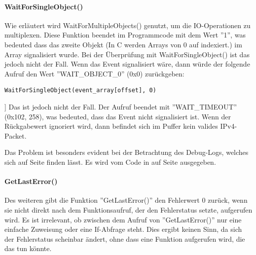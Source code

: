 \paragraph{WaitForSingleObject()}
Wie erläutert wird WaitForMultipleObjects() genutzt, um die IO-Operationen
zu multiplexen. Diese Funktion beendet im Programmcode mit dem Wert ''1'',
was bedeuted dass das zweite Objekt (In C werden Arrays von 0 auf indexiert.)
im Array signalisiert wurde. Bei der Überprüfung mit WaitForSingleObject() ist das jedoch nicht
der Fall. Wenn das Event signalisiert wäre, dann würde der folgende Aufruf
den Wert ''WAIT\_OBJECT\_0'' (0x0) zurückgeben:
\begin{lstlisting}
WaitForSingleObject(event_array[offset], 0)
\end{lstlisting}]
Das ist jedoch nicht der Fall. Der Aufruf beendet mit ''WAIT\_TIMEOUT'' (0x102, 258),
was bedeuted, dass das Event nicht signalisiert ist. Wenn der Rückgabewert
ignoriert wird, dann befindet sich im Puffer kein valides IPv4-Packet.

Das Problem ist besonders evident bei der Betrachtung des Debug-Logs,
welches sich auf Seite \pageref{lst:debug-log} finden lässt.
Es wird vom Code in auf Seite \pageref{lst:handle-plain-windows} ausgegeben.

\paragraph{GetLastError()}
Des weiteren gibt die Funktion ''GetLastError()'' den Fehlerwert 0 zurück, wenn sie nicht
direkt nach dem Funktionsaufruf, der den Fehlerstatus setzte, aufgerufen wird.
Es ist irrelevant, ob zwischen dem Aufruf von ''GetLastError()'' nur eine einfache Zuweisung
oder eine If-Abfrage steht.
Dies ergibt keinen Sinn, da sich der Fehlerstatus scheinbar ändert, ohne dass
eine Funktion aufgerufen wird, die das tun könnte.

